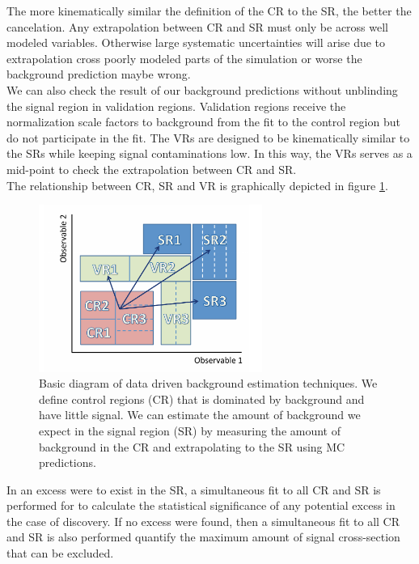 \indent The more kinematically similar the definition of the CR to the SR, the better the cancelation.  Any extrapolation between CR and SR must only be across well modeled variables.  Otherwise large systematic uncertainties will arise due to extrapolation cross poorly modeled parts of the simulation or worse the background prediction maybe wrong.  \\

\indent We can also check the result of our background predictions without unblinding the signal region in validation regions.  Validation regions receive the normalization scale factors to background from the fit to the control region but do not participate in the fit.   The VRs are designed to be kinematically similar to the SRs while keeping signal contaminations low.  In this way, the VRs serves as a mid-point to check the extrapolation between CR and SR.  \\

\indent The relationship between CR, SR and VR is graphically depicted in figure \ref{fig:CR_VR_SR_stat}. \\

\begin{figure}[h!]
  \centering
	\includegraphics[width=0.65\textwidth]{./figures/statistics/CR_VR_SR.pdf}
\caption{\label{fig:CR_VR_SR_stat}{Basic diagram of data driven background estimation techniques.  We define control regions (CR) that is dominated by background and have little signal.  We can estimate the amount of background we expect in the signal region (SR) by measuring the amount of background in the CR and extrapolating to the SR using MC predictions. }}
\end{figure}

\indent In an excess were to exist in the SR, a simultaneous fit to all CR and SR is performed for to calculate the statistical significance of any potential excess in the case of discovery.   If no excess were found, then a simultaneous fit to all CR and SR is also performed quantify the maximum amount of signal cross-section that can be excluded.  \\

